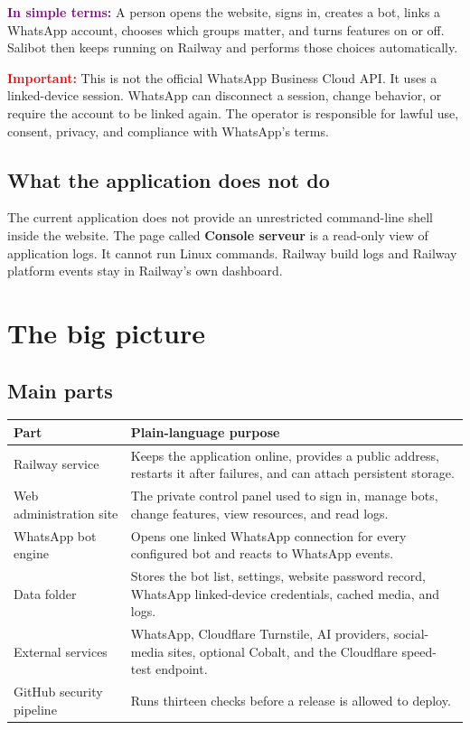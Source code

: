 \documentclass[11pt,a4paper]{article}
\newcommand{\plain}[1]{\textcolor{purple}{\textbf{In simple terms:}} #1}
\newcommand{\warning}[1]{\textcolor{red}{\textbf{Important:}} #1}
\begin{document}
\plain{A person opens the website, signs in, creates a bot, links a WhatsApp account, chooses which groups matter, and turns features on or off. Salibot then keeps running on Railway and performs those choices automatically.}

\warning{This is not the official WhatsApp Business Cloud API. It uses a linked-device session. WhatsApp can disconnect a session, change behavior, or require the account to be linked again. The operator is responsible for lawful use, consent, privacy, and compliance with WhatsApp's terms.}

\subsection{What the application does not do}

The current application does not provide an unrestricted command-line shell inside the website. The page called \textbf{Console serveur} is a read-only view of application logs. It cannot run Linux commands. Railway build logs and Railway platform events stay in Railway's own dashboard.

\section{The big picture}

\subsection{Main parts}

\begin{tabularx}{\textwidth}{p{}X}
\toprule
\textbf{Part} & \textbf{Plain-language purpose}\\
\midrule
Railway service & Keeps the application online, provides a public address, restarts it after failures, and can attach persistent storage.\\
Web administration site & The private control panel used to sign in, manage bots, change features, view resources, and read logs.\\
WhatsApp bot engine & Opens one linked WhatsApp connection for every configured bot and reacts to WhatsApp events.\\
Data folder & Stores the bot list, settings, website password record, WhatsApp linked-device credentials, cached media, and logs.\\
External services & WhatsApp, Cloudflare Turnstile, AI providers, social-media sites, optional Cobalt, and the Cloudflare speed-test endpoint.\\
GitHub security pipeline & Runs thirteen checks before a release is allowed to deploy.\\
\bottomrule
\end{tabularx}
\end{document}
